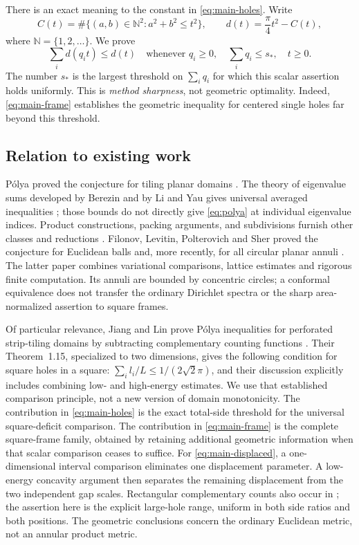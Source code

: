 \documentclass[11pt,reqno]{amsart}
\numberwithin{equation}{section}
\newcommand{\N}{\mathbb N}
\newcommand{\sstar}{s_*}
\begin{document}
There is an exact meaning to the constant in \eqref{eq:main-holes}.
Write
\begin{equation}\label{eq:count-intro}
 C(t)=\#\{(a,b)\in\N^2:a^2+b^2\le t^2\},
 \qquad d(t)=\frac\pi4t^2-C(t),
\end{equation}
where $\N=\{1,2,\ldots\}$. We prove
\begin{equation}\label{eq:scalar-main}
 \sum_i d(q_it)\le d(t)
 \quad\text{whenever }q_i\ge0,\quad
 \sum_iq_i\le\sstar,\quad t\ge0.
\end{equation}
The number $\sstar$ is the largest threshold on $\sum_iq_i$ for
which this scalar assertion holds uniformly. This is \emph{method
sharpness}, not geometric optimality. Indeed,
\eqref{eq:main-frame} establishes the geometric inequality for
centered single holes far beyond this threshold.

\subsection*{Relation to existing work}

P\'olya proved the conjecture for tiling planar domains
\cite{Polya1961}. The theory of eigenvalue sums developed by Berezin
and by Li and Yau gives universal averaged inequalities
\cite{Berezin1972,LiYau1983}; those bounds do not directly give
\eqref{eq:polya} at individual eigenvalue indices. Product
constructions, packing arguments, and subdivisions furnish other
classes and reductions \cite{Laptev1997,FLP2019,FS2023,HW2025}.
Filonov, Levitin, Polterovich and Sher proved the conjecture for
Euclidean balls \cite{FLPS2023} and, more recently, for all circular
planar annuli \cite{FLPS2026}. The latter paper combines
variational comparisons, lattice estimates and rigorous finite
computation. Its annuli are bounded by concentric circles; a
conformal equivalence does not transfer the ordinary Dirichlet
spectra or the sharp area-normalized assertion to square frames.

Of particular relevance, Jiang and Lin prove P\'olya inequalities
for perforated strip-tiling domains by subtracting complementary
counting functions \cite{JL2026}. Their Theorem~1.15, specialized to two dimensions,
gives the following condition for square holes in a square:
$\sum_i l_i/L\le1/(2\sqrt2\pi)$, and their discussion explicitly
includes combining low- and high-energy estimates. We use that
established comparison principle, not a new version of domain
monotonicity. The contribution in \eqref{eq:main-holes} is the exact
total-side threshold for the universal square-deficit comparison.
The contribution in \eqref{eq:main-frame} is the complete square-frame
family, obtained by retaining additional geometric information when
that scalar comparison ceases to suffice. For
\eqref{eq:main-displaced}, a one-dimensional interval comparison
eliminates one displacement parameter. A low-energy concavity
argument then separates the remaining displacement from the two
independent gap scales. Rectangular complementary counts also
occur in \cite[Remark~3.5]{JL2026}; the assertion here is the
explicit large-hole range, uniform in both side ratios and both
positions. The geometric conclusions concern
the ordinary Euclidean metric, not an annular product metric.
\end{document}

